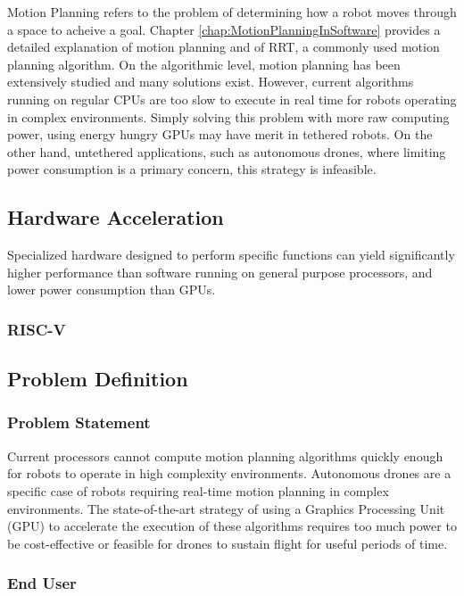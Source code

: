         Motion Planning refers to the problem of determining how a robot moves through a space to acheive a goal. Chapter \ref{chap:MotionPlanningInSoftware} provides a detailed explanation of motion planning and of \ac{RRT}, a commonly used motion planning algorithm.
        \newline
        On the algorithmic level, motion planning has been extensively studied and many solutions exist. However, current algorithms running on regular \ac{CPU}s are too slow to execute in real time for robots operating in complex environments. Simply solving this problem with more raw computing power, using energy hungry \ac{GPU}s may have merit in tethered robots. On the other hand, untethered applications, such as autonomous drones, where limiting power consumption is a primary concern, this strategy is infeasible.
        
    \subsection*{Hardware Acceleration}
        Specialized hardware designed to perform specific functions can yield significantly higher performance than software running on general purpose processors, and lower power consumption than \ac{GPU}s.

    \subsubsection{RISC-V}


\subsection{Problem Definition}

    \subsubsection*{Problem Statement}
    Current processors cannot compute motion planning algorithms quickly enough for robots to operate in high complexity environments. Autonomous drones are a specific case of robots requiring real-time motion planning in complex environments. The state-of-the-art strategy of using a Graphics Processing Unit (GPU) to accelerate the execution of these algorithms requires too much power to be cost-effective or feasible for drones to sustain flight for useful periods of time.

    \subsubsection*{End User}
